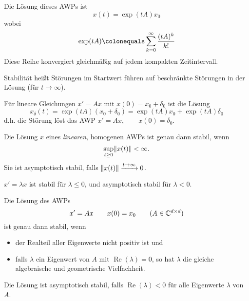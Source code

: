 \begin{satz}
	Die Lösung dieses AWPs ist
	\begin{equation*}
		x(t)=\exp (tA)x_0
	\end{equation*}
	wobei
	\begin{equation*}
		\exp (tA)\colonequals\sum_{k=0}^{\infty} \frac{(tA)^k}{k!}
	\end{equation*}
	Diese Reihe konvergiert gleichmäßig auf jedem kompakten Zeitintervall.
\end{satz}

Stabilität heißt Störungen im Startwert führen auf beschränkte Störungen in der Lösung (für $t \to \infty$).

Für lineare Gleichungen $x' =Ax$ mit $x(0)=x_0 + \delta_0$ ist die Lösung
\begin{equation*}
	x_{\delta}(t)=\exp (tA) \left(x_0+\delta_0 \right)=\exp (tA)x_0+\exp (tA) \delta_0
\end{equation*}
d.h. die Störung löst das AWP $x' = Ax,\qquad x(0)=\delta_0$.

\begin{lemma}
	Die Lösung $x$ eines \textit{linearen}, homogenen AWPs ist genau dann stabil, wenn
	\begin{equation*}
		\sup_{t \geq 0} \lVert x(t) \rVert <\infty.
	\end{equation*}
	Sie ist asymptotisch stabil, falls $\lVert x(t) \rVert \xrightarrow[]{t \to \infty} 0$.
\end{lemma}

\begin{bsp}
	$x' =\lambda x$ ist stabil für $\lambda \leq 0$, und asymptotisch stabil für $\lambda <0$.
\end{bsp}

\begin{satz}
	Die Lösung des AWPs
	\begin{equation*}
		x' = Ax\qquad x(0)=x_0\qquad (A\in \mathbb C^{d \times d})
	\end{equation*}
	ist genau dann stabil, wenn 
	\begin{itemize}
		\item der Realteil aller Eigenwerte nicht positiv ist und
		\item falls $\lambda$ ein Eigenwert von $A$ mit $\operatorname{Re}(\lambda)=0$, so hat $\lambda$
		die gleiche algebraische und geometrische Vielfachheit.
	\end{itemize}
	Die Lösung ist asymptotisch stabil, falls $\operatorname{Re}(\lambda)<0$ für alle Eigenwerte $\lambda$ von $A$.
\end{satz}


